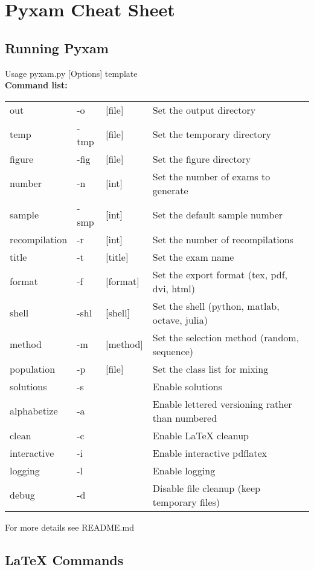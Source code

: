 \documentclass[9pt]{extarticle}
\begin{document}
\centering\section*{Pyxam Cheat Sheet}
\begin{multicols}{2}
\raggedright\subsection*{Running Pyxam}
Usage pyxam.py [Options] template \\
{\bf Command list:} \\
\begin{tabular}{l l l l}
  out & -o  & [file] & Set the output directory \\ 
  temp & -tmp & [file] & Set the temporary directory \\
  figure & -fig & [file] & Set the figure directory \\
  number & -n & [int] & Set the number of exams to generate \\
  sample & -smp & [int] & Set the default sample number \\
  recompilation & -r & [int] & Set the number of recompilations \\
  title & -t & [title] & Set the exam name \\
  format & -f & [format] & Set the export format (tex, pdf, dvi, html) \\
  shell & -shl & [shell] & Set the shell (python, matlab, octave, julia) \\
  method & -m & [method] & Set the selection method (random, sequence) \\
  population & -p & [file] & Set the class list for mixing \\
  solutions & -s & & Enable solutions \\
  alphabetize & -a & & Enable lettered versioning rather than numbered \\
  clean & -c & & Enable LaTeX cleanup \\
  interactive & -i & & Enable interactive pdflatex \\
  logging & -l & & Enable logging \\
  debug & -d & & Disable file cleanup (keep temporary files) \\
\end{tabular} 

For more details see README.md \\
\subsection*{LaTeX Commands}


\end{multicols}
\end{document}
